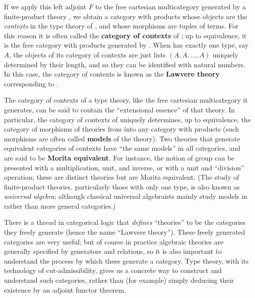 If we apply this left adjoint $F$ to the free cartesian multicategory generated by a finite-product theory \cG, we obtain a category with products whose objects are the \emph{contexts} in the type theory of \cG, and whose morphisms are tuples of terms.
For this reason it is often called the \textbf{category of contexts} of \cG; up to equivalence, it is the free category with products generated by \cG.
When \cG has exactly one type, say $A$, the objects of its category of contexts are just lists $(A,A,\dots,A)$ uniquely determined by their length, and so they can be identified with natural numbers.
In this case, the category of contexts is known as the \textbf{Lawvere theory}~\cite{lawvere:functsem} corresponding to \cG.

The category of contexts of a type theory, like the free cartesian multicategory it generates, can be said to contain the ``extensional essence'' of that theory.
In particular, the category of contexts of \cG uniquely determines, up to equivalence, the category of morphisms of theories from \cG into any category with products (such morphisms are often called \textbf{models} of the theory).
Two theories that generate equivalent categories of contexts have ``the same models'' in all categories, and are said to be \textbf{Morita equivalent}.
For instance, the notion of group can be presented with a multiplication, unit, and inverse, or with a unit and ``division'' operation; these are distinct theories but are Morita equivalent.
(The study of finite-product theories, particularly those with only one type, is also known as \emph{universal algebra}; although classical universal algebraists mainly study models in \bSet rather than more general categories.)

There is a thread in categorical logic that \emph{defines} ``theories'' to be the categories they freely generate (hence the name ``Lawvere theory'').
These freely generated categories are very useful; but of course in practice algebraic theories are generally specified by generators and relations, so it is also important to understand the process by which these generate a category.
Type theory, with its technology of cut-admissibility, gives us a concrete way to construct and understand such categories, rather than (for example) simply deducing their existence by an adjoint functor theorem.


